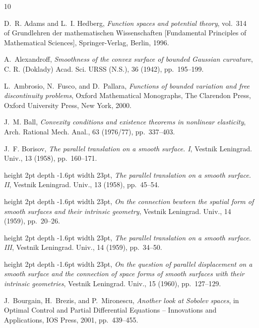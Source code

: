 \documentclass[12pt]{article}
\theoremstyle{plain}
\numberwithin{equation}{section}
\begin{document}
\begin{thebibliography}{10}

{\sc D.~R. Adams and L.~I. Hedberg}, {\em Function spaces and potential
  theory}, vol.~314 of Grundlehren der mathematischen Wissenschaften
  [Fundamental Principles of Mathematical Sciences], Springer-Verlag, Berlin,
  1996.

{\sc A.~Alexandroff}, {\em Smoothness of the convex surface of bounded
  {G}aussian curvature}, C. R. (Doklady) Acad. Sci. URSS (N.S.), 36 (1942),
  pp.~195--199.

{\sc L.~Ambrosio, N.~Fusco, and D.~Pallara}, {\em Functions of bounded
  variation and free discontinuity problems}, Oxford Mathematical Monographs,
  The Clarendon Press, Oxford University Press, New York, 2000.

{\sc J.~M. Ball}, {\em Convexity conditions and existence theorems in nonlinear
  elasticity}, Arch. Rational Mech. Anal., 63 (1976/77), pp.~337--403.

{\sc J.~F. Borisov}, {\em The parallel translation on a smooth surface. {I}},
  Vestnik Leningrad. Univ., 13 (1958), pp.~160--171.

\leavevmode\vrule height 2pt depth -1.6pt width 23pt, {\em The parallel
  translation on a smooth surface. {II}}, Vestnik Leningrad. Univ., 13 (1958),
  pp.~45--54.

\leavevmode\vrule height 2pt depth -1.6pt width 23pt, {\em On the connection
  bewteen the spatial form of smooth surfaces and their intrinsic geometry},
  Vestnik Leningrad. Univ., 14 (1959), pp.~20--26.

\leavevmode\vrule height 2pt depth -1.6pt width 23pt, {\em The parallel
  translation on a smooth surface. {III}}, Vestnik Leningrad. Univ., 14 (1959),
  pp.~34--50.

\leavevmode\vrule height 2pt depth -1.6pt width 23pt, {\em On the question of
  parallel displacement on a smooth surface and the connection of space forms
  of smooth surfaces with their intrinsic geometries}, Vestnik Leningrad.
  Univ., 15 (1960), pp.~127--129.

{\sc J.~Bourgain, H.~Brezis, and P.~Mironescu}, {\em Another look at {S}obolev
  spaces}, in Optimal Control and Partial Differential Equations -- Innovations
  and Applications, IOS Press, 2001, pp.~439--455.


\end{thebibliography}
\end{document}
